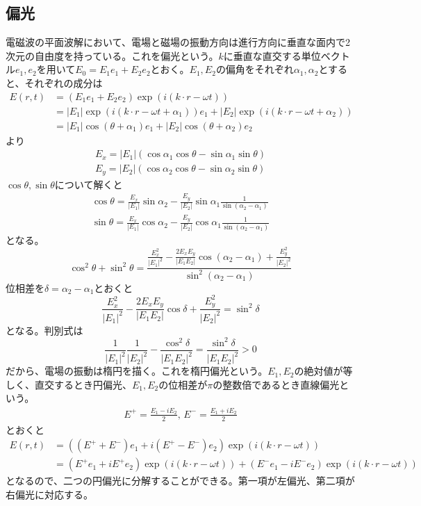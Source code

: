\subsection{偏光}
    電磁波の平面波解において、電場と磁場の振動方向は進行方向に垂直な面内で2次元の自由度を持っている。これを偏光という。$k$に垂直な直交する単位ベクトル$e_1, e_2$を用いて$E_0 = E_1e_1 + E_2e_2$とおく。$E_1, E_2$の偏角をそれぞれ$\alpha_1, \alpha_2$とすると、それぞれの成分は
    \begin{align*}
        E(r, t)
        &= (E_1e_1 + E_2e_2)\exp(i(k \cdot r - \omega t))\\
        &= |E_1|\exp(i(k \cdot r - \omega t + \alpha_1))e_1 + |E_2|\exp(i(k \cdot r - \omega t + \alpha_2))\\
        &= |E_1|\cos(\theta + \alpha_1)e_1 + |E_2|\cos(\theta + \alpha_2)e_2
    \end{align*}
    より
    \begin{align*}
        E_x = |E_1|(\cos\alpha_1\cos\theta - \sin\alpha_1\sin\theta)\\
        E_y = |E_2|(\cos\alpha_2\cos\theta - \sin\alpha_2\sin\theta)
    \end{align*}
    $\cos\theta, \sin\theta$について解くと
    \begin{align*}
        \cos\theta = \frac{E_x}{|E_1|}\sin\alpha_2 - \frac{E_y}{|E_2|}\sin\alpha_1\frac{1}{\sin(\alpha_2 - \alpha_1)}\\
        \sin\theta = \frac{E_x}{|E_1|}\cos\alpha_2 - \frac{E_y}{|E_2|}\cos\alpha_1\frac{1}{\sin(\alpha_2 - \alpha_1)}
    \end{align*}
    となる。
        \[\cos^2\theta + \sin^2\theta = \frac{\frac{E_x^2}{|E_1|^2} - \frac{2E_xE_y}{|E_1E_2|}\cos(\alpha_2 - \alpha_1) + \frac{E_y^2}{|E_2|^2}}{\sin^2(\alpha_2 - \alpha_1)}\]
    位相差を$\delta = \alpha_2 - \alpha_1$とおくと
        \[\frac{E_x^2}{|E_1|^2} - \frac{2E_xE_y}{|E_1E_2|}\cos\delta + \frac{E_y^2}{|E_2|^2} = \sin^2\delta\]
    となる。判別式は
        \[\frac{1}{|E_1|^2}\frac{1}{|E_2|^2} - \frac{\cos^2\delta}{|E_1E_2|^2} = \frac{\sin^2\delta}{|E_1E_2|^2} > 0\]
    だから、電場の振動は楕円を描く。これを楕円偏光という。$E_1, E_2$の絶対値が等しく、直交するとき円偏光、$E_1, E_2$の位相差が$\pi$の整数倍であるとき直線偏光という。
    \begin{align*}
        E^+ = \frac{E_1 - iE_2}{2},\,
        E^- = \frac{E_1 + iE_2}{2}
    \end{align*}
    とおくと
    \begin{align*}
        E(r, t)
        &= ((E^+ + E^-)e_1 + i(E^+ - E^-)e_2)\exp(i(k \cdot r - \omega t))\\
        &= (E^+e_1 + iE^+e_2)\exp(i(k \cdot r - \omega t)) + (E^-e_1 - iE^-e_2)\exp(i(k \cdot r - \omega t))
    \end{align*}
    となるので、二つの円偏光に分解することができる。第一項が左偏光、第二項が右偏光に対応する。

